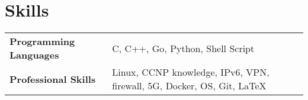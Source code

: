 \documentclass[letterpaper,11pt]{article}
\begin{document}
\section{Skills}
    \begin{tabular}{ l l }
     \textbf{Programming Languages}\qquad \qquad & C, C++, Go, Python, Shell Script\\
     \textbf{Professional Skills} & Linux, CCNP knowledge, IPv6, VPN, firewall, 5G, Docker, OS, Git, \LaTeX\\
     \end{tabular}
\end{document}
